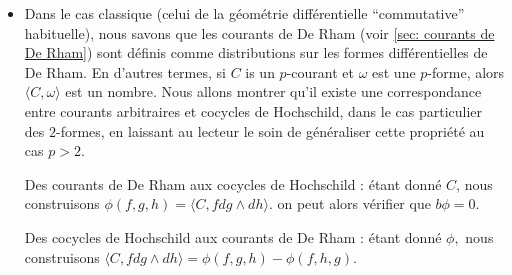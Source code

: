 \begin{itemize}
Puisque nous avons un op\'erateur cobord (il est de carr\'e nul et envoie bien les $n$ formes dans 
les $n+1$ formes), nous pouvons d\'efinir  l'espace des cocycles de 
Hochschild  $  Z^n=\{\phi \in C^n / b\phi = 0\},$ l'espace des 
cobords de
Hochschild $  B^n=\{\phi \in C^n / \phi = b\psi \, \rm{for} \, \psi \in C^{n-1} \}$  
et les groupes de cohomologie (de Hochschild) correspondants  $  H^n 
 =  Z^n/B^n .$  
Ci-dessus,  la notation $  C^n $, l'espace des cochaines de 
Hochschild,  d\'esigne l'espace des formes
 $ n+1 $   multilin\'eaires sur  $  {\mathcal A} $ (attention \`a la translation 
 d'une unit\'e). \par 
 
Remarque terminologique : un lecteur curieux, qui chercherait la d\'efinition 
de la cohomologie de Hochschild dans un ouvrage d'alg\`ebre 
homologique pourrait \^etre surpris car celle-ci fait 
d'ordinaire r\'ef\'erence au choix d'un certain bimodule. Ici, le bimodule 
en question n'est autre que le
dual de  $ {\mathcal A} $. Nous n'avions pas besoin de mentionner ceci plus 
haut mais il est bon de savoir que c'est pr\'ecisemment ce choix 
particulier de bimodule (ainsi que l'existence d'un accouplement naturel entre ${\mathcal A}$ et son dual 
${\mathcal A}^{*}$) qui est \`a l'origine de la d\'efinition pr\'ec\'edente de $b$.


	\item  Dans le cas classique (celui de la g\'eom\'etrie diff\'erentielle ``commutative'' 
 habituelle), nous savons que les courants de De Rham (voir 
 \ref{sec: courants de De Rham}) sont d\'efinis comme distributions sur les formes 
 diff\'erentielles de De Rham. En d'autres termes,  si  $  C $   is
un  $  p $-courant et  $  \omega $   est une  $  p $-forme, alors$  \langle 
C,\omega \rangle $ est un nombre.
Nous allons montrer qu'il existe une correspondance entre courants 
arbitraires et cocycles de Hochschild, dans le cas particulier des 
$2$-formes, en laissant au lecteur le soin de g\'en\'eraliser cette 
propri\'et\'e au cas $p>2.$
 \par 

Des courants de De Rham aux cocycles de Hochschild : \'etant 
donn\'e  $  C $, nous construisons  $  \phi(f,g,h)  =  \langle C,f dg \wedge dh \rangle .$   
on peut alors v\'erifier que  $  b\phi = 0.$   \par
 
Des cocycles de Hochschild aux courants de De Rham :   \'etant donn\'e $  \phi ,$
nous construisons  $  \langle C, f dg \wedge dh \rangle   =  \phi(f,g,h)-\phi(f,h,g). $  \par


\end{itemize}
